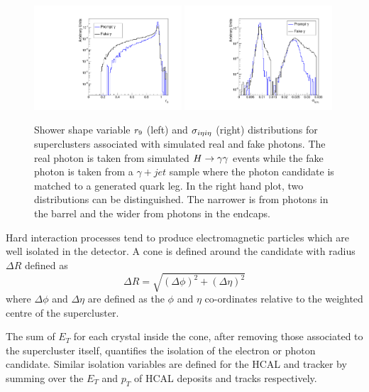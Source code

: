 \begin{figure}[hbt!]
\begin{center}
	\includegraphics[width=0.49\textwidth]{detector/r9eg.pdf}
	\includegraphics[width=0.49\textwidth]{detector/sieieeg.pdf}
	\caption{Shower shape variable $r_{9}$ (left) and $\sigma_{i\eta i\eta}$ (right) distributions 
	for superclusters associated with simulated real and fake photons. The real photon is taken
	from simulated $H\rightarrow\gamma\gamma$ events while the fake photon is taken from a $\gamma+jet$ sample
	where the photon candidate is matched to a generated quark leg. In the right hand plot,
	two distributions can be distinguished. The narrower is from photons in the barrel and
	the wider from photons in the endcaps. }
	\label{fig:showershape}
\end{center}
\end{figure}

Hard interaction processes tend to produce electromagnetic particles which are well
isolated in the detector. A cone is defined around the candidate with radius $\Delta R$ defined as 
\begin{equation}
\Delta R = \sqrt{(\Delta\phi)^{2}+(\Delta\eta)^{2}}
\end{equation}
where $\Delta\phi$ and $\Delta\eta$ are defined as the $\phi$ and $\eta$ co-ordinates relative to the 
weighted centre of the supercluster.

The sum of $E_{T}$ for each crystal inside the cone, after removing those associated 
to the supercluster itself, quantifies the isolation of the electron or photon candidate.
Similar isolation variables are defined for the HCAL and tracker by
summing over the $E_{T}$ and $p_{T}$ of HCAL deposits and tracks respectively.

